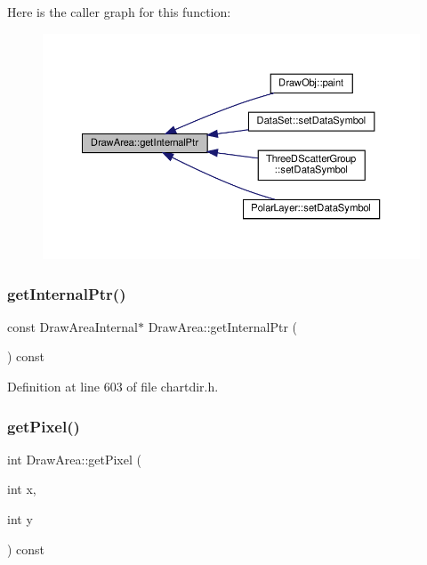 Here is the caller graph for this function\+:
\nopagebreak
\begin{figure}[H]
\begin{center}
\leavevmode
\includegraphics[width=350pt]{class_draw_area_a975123b22c1437e30bde57e1baa69778_icgraph}
\end{center}
\end{figure}
\mbox{\label{class_draw_area_a1fd4da2ad1b70241d04328e58dd75b7e}} 
\subsubsection{\texorpdfstring{get\+Internal\+Ptr()}{getInternalPtr()}\hspace{0.1cm}{\footnotesize\ttfamily [2/2]}}
{\footnotesize\ttfamily const Draw\+Area\+Internal$\ast$ Draw\+Area\+::get\+Internal\+Ptr (\begin{DoxyParamCaption}{ }\end{DoxyParamCaption}) const\hspace{0.3cm}{\ttfamily [inline]}}



Definition at line 603 of file chartdir.\+h.

\mbox{\label{class_draw_area_af2420b0129e8e79b455c507f017c8c7d}} 
\subsubsection{\texorpdfstring{get\+Pixel()}{getPixel()}}
{\footnotesize\ttfamily int Draw\+Area\+::get\+Pixel (\begin{DoxyParamCaption}\item[{int}]{x,  }\item[{int}]{y }\end{DoxyParamCaption}) const\hspace{0.3cm}{\ttfamily [inline]}}



